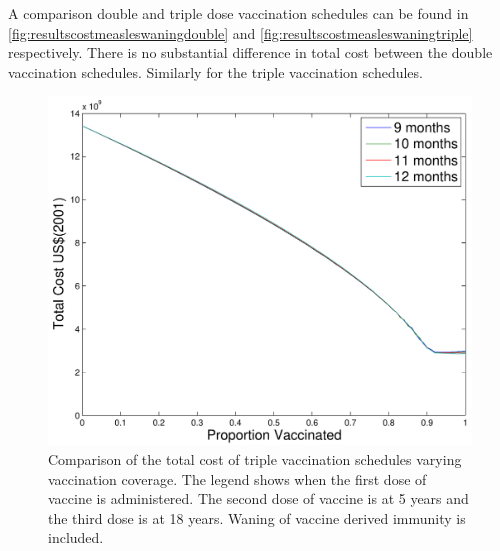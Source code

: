 \documentclass[a4paper,11pt] {scrartcl}
\begin{document}
A comparison double and triple dose vaccination schedules can be found in \autoref{fig:resultscostmeasleswaningdouble} and \autoref{fig:resultscostmeasleswaningtriple} respectively. There is no substantial difference in total cost between the double vaccination schedules. Similarly for the triple vaccination schedules. 
\begin{figure}[h]
	\centering
	\includegraphics[width=120mm]{costmeasleswaningtriple}
	\caption{Comparison of the total cost of triple vaccination schedules varying vaccination coverage. The legend shows when the first dose of vaccine is administered. The second dose of vaccine is at 5 years and the third dose is at 18 years. Waning of vaccine derived immunity is included.}
	\label{fig:resultscostmeasleswaningtriple}
\end{figure}
\end{document}
